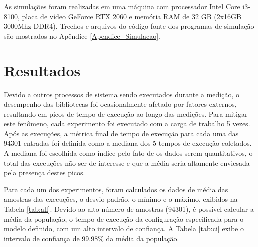 As simulações foram realizadas em uma máquina com processador Intel Core i3-8100, placa de vídeo GeForce RTX 2060 e memória RAM de 32 GB (2x16GB 3000Mhz DDR4). Trechos e arquivos do código-fonte dos programas de simulação são mostrados no Apêndice \ref{Apendice_Simulacao}.

\section{Resultados}

Devido a outros processos de sistema sendo executados durante a medição, o desempenho das bibliotecas foi ocasionalmente afetado por fatores externos, resultando em picos de tempo de execução ao longo das medições. Para mitigar este fenômeno, cada experimento foi executado com a carga de trabalho 5 vezes. Após as execuções, a métrica final de tempo de execução para cada uma das 94301 entradas foi definida como a mediana dos 5 tempos de execução coletados. A mediana foi escolhida como índice pelo fato de os dados serem quantitativos, o total das execuções não ser de interesse e que a média seria altamente enviesada pela presença destes picos.

Para cada um dos experimentos, foram calculados os dados de média das amostras das execuções, o desvio padrão, o mínimo e o máximo, exibidos na Tabela \ref{tab:all}. Devido ao alto número de amostras (94301), é possível calcular a média da população, o tempo de execução da configuração especificada para o modelo definido, com um alto intervalo de confiança. A Tabela \ref{tab:ci} exibe o intervalo de confiança de 99.98\% da média da população.


